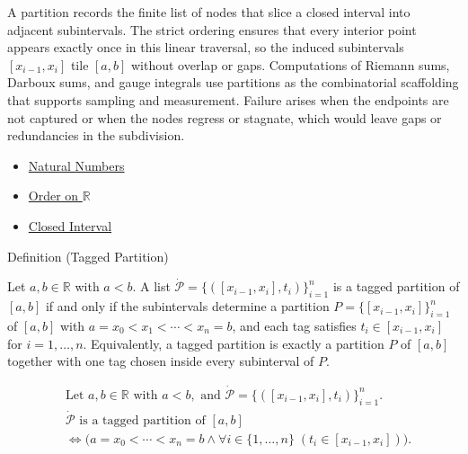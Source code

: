 \begin{remark*}[Interpretation]
A partition records the finite list of nodes that slice a closed interval into adjacent subintervals. The strict ordering ensures that every interior point appears exactly once in this linear traversal, so the induced subintervals $[x_{i-1},x_i]$ tile $[a,b]$ without overlap or gaps. Computations of Riemann sums, Darboux sums, and gauge integrals use partitions as the combinatorial scaffolding that supports sampling and measurement. Failure arises when the endpoints are not captured or when the nodes regress or stagnate, which would leave gaps or redundancies in the subdivision.
\end{remark*}

\begin{dependencies}
\begin{itemize}
  \item \hyperref[def:natural-numbers]{Natural Numbers}
  \item \hyperref[def:order-on-r]{Order on $\mathbb{R}$}
  \item \hyperref[def:closed-interval]{Closed Interval}
\end{itemize}
\end{dependencies}

\begin{definitionbox}{Definition (Tagged Partition)}
\begin{definition}
\label{def:tagged-partition}
Let $a,b \in \mathbb{R}$ with $a < b$. A list $\dot{\mathcal{P}}=\{([x_{i-1},x_i],t_i)\}_{i=1}^n$ is a tagged partition of $[a,b]$ if and only if the subintervals determine a partition $P=\{[x_{i-1},x_i]\}_{i=1}^n$ of $[a,b]$ with $a=x_0 < x_1 < \cdots < x_n=b$, and each tag satisfies $t_i \in [x_{i-1},x_i]$ for $i=1,\ldots,n$. Equivalently, a tagged partition is exactly a partition $P$ of $[a,b]$ together with one tag chosen inside every subinterval of $P$.
\end{definition}
\end{definitionbox}

\begin{remark*}
\[
\begin{aligned}
&\text{Let } a,b \in \mathbb{R} \text{ with } a<b, \text{ and } \dot{\mathcal{P}}=\{([x_{i-1},x_i],t_i)\}_{i=1}^n.\\
&\dot{\mathcal{P}} \text{ is a tagged partition of } [a,b]\\
&\Longleftrightarrow \bigl(a=x_0<\cdots<x_n=b \land \forall i \in \{1,\ldots,n\}\;(t_i \in [x_{i-1},x_i])\bigr).
\end{aligned}
\]
\end{remark*}

